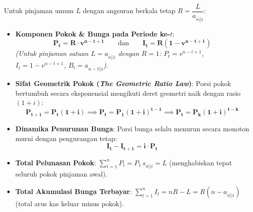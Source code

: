 \documentclass[10pt,a4paper]{article}
\newcommand{\angl}[1]{\overline{#1|}}
\begin{document}
\begin{rumusbox}
Untuk pinjaman umum $L$ dengan angsuran berkala tetap $R = \dfrac{L}{a_{\angl{n}|i}}$:
\begin{itemize}[leftmargin=1.5em, topsep=1.5pt, itemsep=2pt]
    \item \textbf{Komponen Pokok \& Bunga pada Periode ke-$t$}:
    \begin{equation*}
        \mathbf{P_t = R \cdot v^{n-t+1}} \qquad\text{dan}\qquad \mathbf{I_t = R \left( 1 - v^{n-t+1} \right)}
    \end{equation*}
    \textit{(Untuk pinjaman satuan $L = a_{\angl{n}|i}$ dengan $R = 1$: $P_t = v^{n-t+1}$, $I_t = 1 - v^{n-t+1}$, $B_t = a_{\angl{n-t}|i}$)}.
    \item \textbf{Sifat Geometrik Pokok (\textit{The Geometric Ratio Law})}:
    Porsi pokok bertumbuh secara eksponensial mengikuti deret geometri naik dengan rasio $(1+i)$:
    \begin{equation*}
        \mathbf{P_{t+1} = P_t(1+i)} \implies \mathbf{P_t = P_1(1+i)^{t-1}} \implies \mathbf{P_t = P_k(1+i)^{t-k}}
    \end{equation*}
    \item \textbf{Dinamika Penurunan Bunga}: Porsi bunga selalu menurun secara monoton murni dengan pengurangan tetap:
    \begin{equation*}
        \mathbf{I_t - I_{t+1} = i \cdot P_t}
    \end{equation*}
    \item \textbf{Total Pelunasan Pokok}: $\sum\limits_{t=1}^n P_t = P_1 \, s_{\angl{n}|i} = L$ (menghabiskan tepat seluruh pokok pinjaman awal).
    \item \textbf{Total Akumulasi Bunga Terbayar}: $\sum\limits_{t=1}^n I_t = nR - L = R(n - a_{\angl{n}|i})$ (total arus kas keluar minus pokok).
\end{itemize}
\end{rumusbox}
\end{document}
